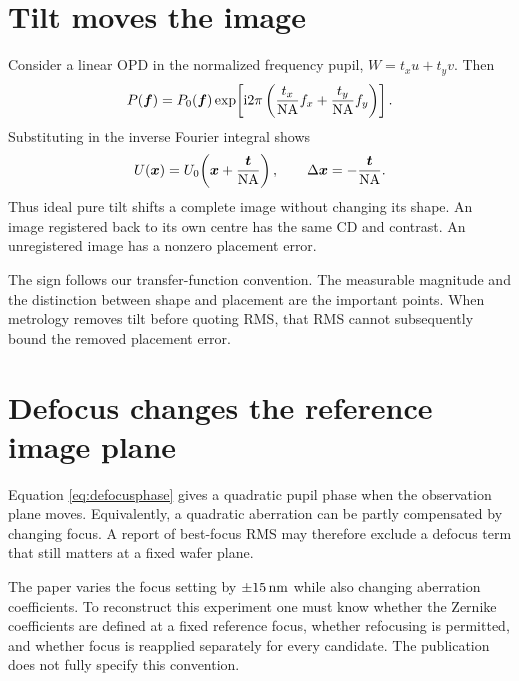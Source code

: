 \section{Tilt moves the image}
Consider a linear OPD in the normalized frequency pupil,
$W=t_xu+t_yv$. Then
\[
P(\bm{f})=P_0(\bm{f})
\exp\!\left[\mathrm{i}2\pi\left(\frac{t_x}{\mathrm{NA}}f_x
+\frac{t_y}{\mathrm{NA}}f_y\right)\right].
\]
Substituting in the inverse Fourier integral shows
\begin{equation}
U(\bm{x})=U_0\!\left(\bm{x}+\frac{\bm{t}}{\mathrm{NA}}\right),
\qquad
\Delta\bm{x}=-\frac{\bm{t}}{\mathrm{NA}}.
\label{eq:tilt}
\end{equation}
Thus ideal pure tilt shifts a complete image without changing its shape.
An image registered back to its own centre has the same CD and contrast.
An unregistered image has a nonzero placement error.

The sign follows our transfer-function convention. The measurable
magnitude and the distinction between shape and placement are the
important points. When metrology removes tilt before quoting RMS,
that RMS cannot subsequently bound the removed placement error.

\section{Defocus changes the reference image plane}
Equation \eqref{eq:defocusphase} gives a quadratic pupil phase when the
observation plane moves. Equivalently, a quadratic aberration can be partly
compensated by changing focus. A report of best-focus RMS may therefore
exclude a defocus term that still matters at a fixed wafer plane.

The paper varies the focus setting by $\pm15\,\mathrm{nm}$ while also changing
aberration coefficients. To reconstruct this experiment one must know
whether the Zernike coefficients are defined at a fixed reference focus,
whether refocusing is permitted, and whether focus is reapplied separately
for every candidate. The publication does not fully specify this convention.

